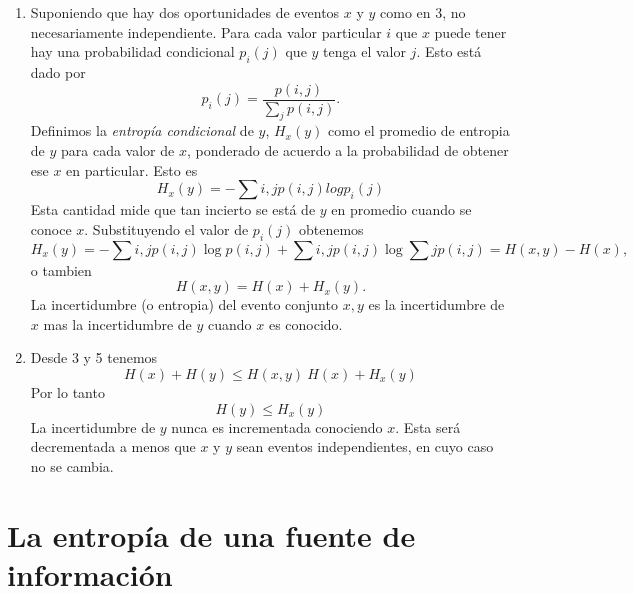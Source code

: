 \begin{enumerate}
\item{Suponiendo que hay dos oportunidades de eventos $x$ y $y$ como
  en 3, no necesariamente independiente. Para cada valor particular
  $i$ que $x$ puede tener hay una probabilidad condicional $p_{i}(j)$
  que $y$ tenga el valor $j$. Esto est\'{a} dado por
\begin{equation}
p_{i}(j) = \frac{p(i,j)}{\sum_{j}p(i,j)}.
\end{equation}
Definimos la \textit{entrop\'{i}a condicional} de $y$, $H_{x}(y)$ como el promedio de entropia de $y$ para cada valor de $x$, ponderado de acuerdo a la probabilidad de obtener ese $x$ en particular. Esto es
\begin{equation}
  H_{x}(y) = -\sum{i,j}{}p(i,j)logp_{i}(j)
\end{equation}
Esta cantidad mide que tan incierto se est\'{a} de $y$ en promedio cuando se conoce $x$. Substituyendo el valor de $p_{i}(j)$ obtenemos
\begin{equation}
  H_{x}(y) = -\sum{i,j}{}p(i,j) \log p(i,j) + \sum{i,j}{}p(i,j)\log\sum{j}{}p(i,j) = H(x,y) - H(x),
\end{equation}
o tambien
\begin{equation}
H(x,y) = H(x) + H_{x}(y).
\end{equation}
La incertidumbre (o entropia) del evento conjunto $x,y$ es la incertidumbre de $x$ mas la incertidumbre de $y$ cuando $x$ es conocido.}
\item{Desde 3 y 5 tenemos
\begin{equation}
H(x) + H(y) \leq H(x,y) \ H(x) + H_{x}(y)
\end{equation}
Por lo tanto
\begin{equation}
H(y) \leq H_{x}(y)
\end{equation}
La incertidumbre de $y$ nunca es incrementada conociendo $x$. Esta
ser\'{a} decrementada a menos que $x$ y $y$ sean eventos
independientes, en cuyo caso no se cambia.}
\end{enumerate}

\clearpage

\chapter{La entrop\'{i}a de una fuente de informaci\'{o}n}
\label{sec:7}

